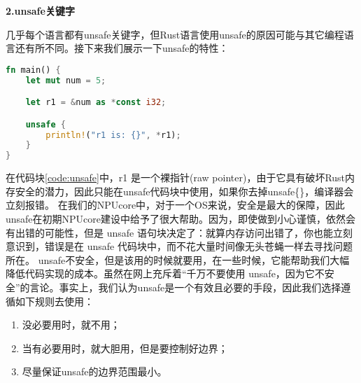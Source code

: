 \textbf{2.unsafe关键字}

几乎每个语言都有unsafe关键字，但Rust语言使用unsafe的原因可能与其它编程语言还有所不同。接下来我们展示一下unsafe的特性：
\begin{lstlisting}[language={Rust}, label={code:unsafe},
	caption={unsafe展示（r1 是一个裸指针）}]
	fn main() {
    let mut num = 5;

    let r1 = &num as *const i32;

    unsafe {
        println!("r1 is: {}", *r1);
    }
}
\end{lstlisting}
在代码块\ref{code:unsafe}中，r1 是一个裸指针(raw pointer)，由于它具有破坏Rust内存安全的潜力，因此只能在unsafe代码块中使用，如果你去掉unsafe\{\}，编译器会立刻报错。
在我们的NPUcore中，对于一个OS来说，安全是最大的保障，因此unsafe在初期NPUcore建设中给予了很大帮助。因为，即使做到小心谨慎，依然会有出错的可能性，但是 unsafe 语句块决定了：就算内存访问出错了，你也能立刻意识到，错误是在 unsafe 代码块中，而不花大量时间像无头苍蝇一样去寻找问题所在。
unsafe不安全，但是该用的时候就要用，在一些时候，它能帮助我们大幅降低代码实现的成本。虽然在网上充斥着“千万不要使用 unsafe，因为它不安全”的言论。事实上，我们认为unsafe是一个有效且必要的手段，因此我们选择遵循如下规则去使用：
\begin{enumerate}
    \item 没必要用时，就不用；
    \item 当有必要用时，就大胆用，但是要控制好边界；
    \item 尽量保证unsafe的边界范围最小。
\end{enumerate}





